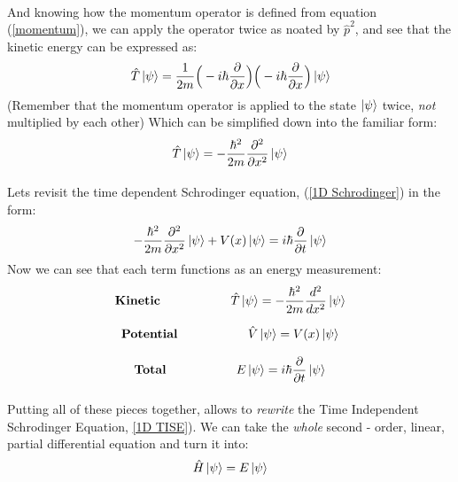 \documentclass[12pt,letterpaper]{book}
\begin{document}
\paragraph*{}And knowing how the momentum operator is defined from equation (\ref{momentum}), we can apply the operator twice as noated by 
$\hat{p}^2$, and see that the kinetic energy can be expressed as:
\begin{equation}
\hat{T}\ket{\psi} = \frac{1}{2m} 
\Big( -i\hbar \frac{\partial}{\partial x}\Big) \Big( -i\hbar \frac{\partial}{\partial x} \Big)\ket{\psi}
\end{equation}
(Remember that the momentum operator is applied to the state $\ket{\psi}$ twice, \textit{not} multiplied by each other) Which can be simplified down into the familiar form:
\begin{equation}
\label{kinetic operator}
\hat{T}\ket{\psi} = -\frac{\hbar ^2}{2m} \frac{\partial^2}{\partial x^2}\ket{\psi}
\end{equation}

\paragraph*{}Lets revisit the time dependent Schrodinger equation, (\ref{1D Schrodinger}) in the form:
\begin{equation}
-\frac{\hbar^2}{2m}\frac{\partial^2}{\partial x^2}\ket{\psi} + V(x)\ket{\psi} = i\hbar\frac{\partial}{\partial t}\ket{\psi}
\end{equation}
Now we can see that each term functions as an energy measurement:
\begin{equation}
\text{\textbf{Kinetic}\hspace{2cm}} \hat{T}\ket{\psi} = -\frac{\hbar^2}{2m}\frac{d^2}{dx^2}\ket{\psi}
\end{equation}

\begin{equation}
\text{\textbf{Potential}\hspace{2cm}} \hat{V}\ket{\psi} = V(x)\ket{\psi}
\end{equation}

\begin{equation}
\text{\textbf{Total}\hspace{2cm}}  E\ket{\psi} = i\hbar\frac{\partial}{\partial t}\ket{\psi}
\end{equation} 

\paragraph*{}Putting all of these pieces together, allows to \textit{rewrite} the Time Independent Schrodinger Equation, \ref{1D TISE}). We can take the \textit{whole} second - order, linear, partial differential equation and turn it into:
\begin{equation}
\label{Hamiltonian EVP}
\hat{H}\ket{\psi} = E\ket{\psi}
\end{equation}
\end{document}
